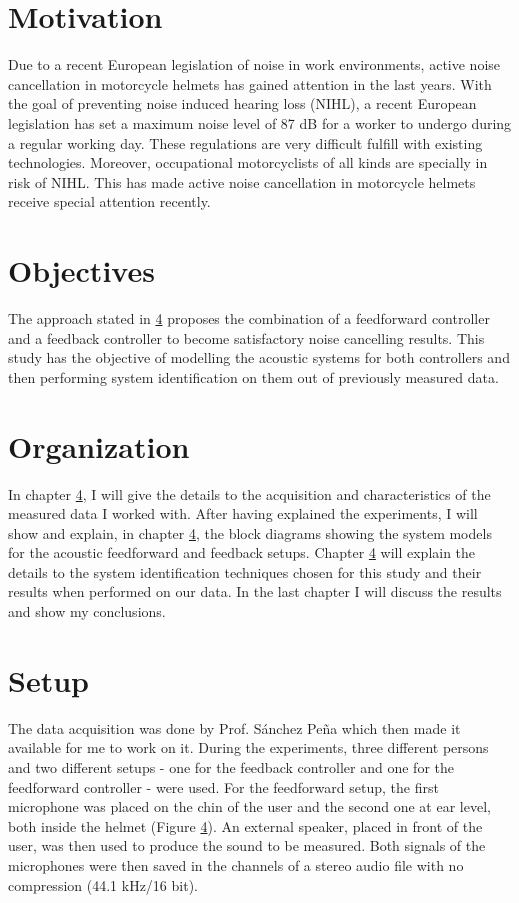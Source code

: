 


\section{Motivation}

Due to a recent European legislation of noise in work environments, active noise cancellation in motorcycle helmets has gained attention in the last years. With the goal of preventing noise induced hearing loss (NIHL), a recent European legislation has set a maximum noise level of 87 dB for a worker to undergo during a regular working day. These regulations are very difficult fulfill with existing technologies. Moreover, occupational motorcyclists of all kinds are specially in risk of NIHL. This has made active noise cancellation in motorcycle helmets receive special attention recently.

\section{Objectives}

The approach stated in \ref{} proposes the combination of a feedforward controller and a feedback controller to become satisfactory noise cancelling results. This study has the objective of modelling the acoustic systems for both controllers and then performing system identification on them out of previously measured data.

\section{Organization}

In chapter \ref{}, I will give the details to the acquisition and characteristics of the measured data I worked with. After having explained the experiments, I will show and explain, in chapter \ref{}, the block diagrams showing the system models for the acoustic feedforward and feedback setups. Chapter \ref{} will explain the details to the system identification techniques chosen for this study and their results when performed on our data. In the last chapter I will discuss the results and show my conclusions.


\section{Setup}
The data acquisition was done by Prof. S\'{a}nchez Pe\~{n}a which then made it available for me to work on it. During the experiments, three different persons and two different setups - one for the feedback controller and one for the feedforward controller -  were used. For the feedforward setup, the first microphone was placed on the chin of the user and  the second one at ear level, both inside the helmet (Figure \ref{}). An external speaker, placed in front of the user, was then used to produce the sound to be measured. Both signals of the microphones were then saved in the channels of a stereo audio file with no compression (44.1 kHz/16 bit).\\

